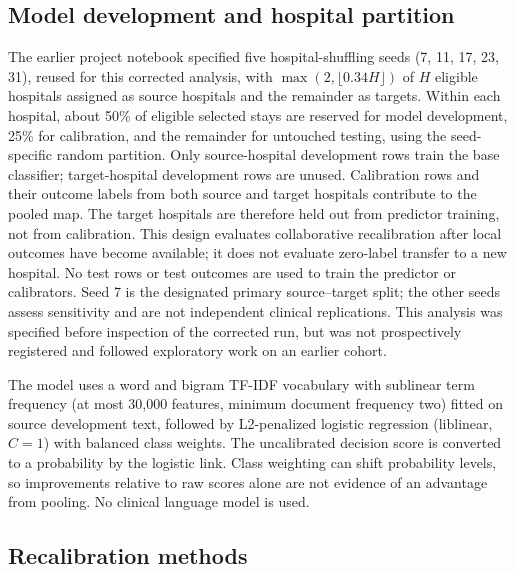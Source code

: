 \documentclass[11pt]{article}
\begin{document}
\subsection*{Model development and hospital partition}\label{model-development-and-hospital-partition}

The earlier project notebook specified five hospital-shuffling seeds (7, 11, 17, 23, 31), reused for this corrected analysis, with $\max(2,\lfloor 0.34H\rfloor)$ of $H$ eligible hospitals assigned as source hospitals and the remainder as targets. Within each hospital, about 50\% of eligible selected stays are reserved for model development, 25\% for calibration, and the remainder for untouched testing, using the seed-specific random partition. Only source-hospital development rows train the base classifier; target-hospital development rows are unused. Calibration rows and their outcome labels from both source and target hospitals contribute to the pooled map. The target hospitals are therefore held out from predictor training, not from calibration. This design evaluates collaborative recalibration after local outcomes have become available; it does not evaluate zero-label transfer to a new hospital. No test rows or test outcomes are used to train the predictor or calibrators. Seed 7 is the designated primary source--target split; the other seeds assess sensitivity and are not independent clinical replications. This analysis was specified before inspection of the corrected run, but was not prospectively registered and followed exploratory work on an earlier cohort.

The model uses a word and bigram TF-IDF vocabulary with sublinear term frequency (at most 30,000 features, minimum document frequency two) fitted on source development text, followed by L2-penalized logistic regression (liblinear, $C=1$) with balanced class weights. The uncalibrated decision score is converted to a probability by the logistic link. Class weighting can shift probability levels, so improvements relative to raw scores alone are not evidence of an advantage from pooling. No clinical language model is used.

\subsection*{Recalibration methods}\label{recalibration-methods}
\end{document}
